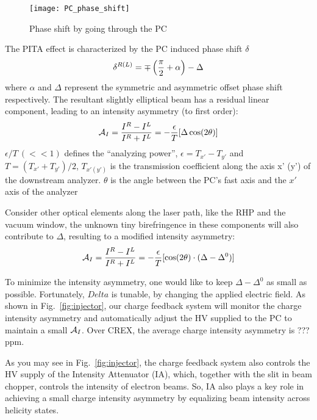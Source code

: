 \begin{figure}[h!]
    \centering
    \texttt{[image: PC\_phase\_shift]}
    \caption{Phase shift by going through the PC}
    \label{fig:pc_phase_shift}
\end{figure}

The PITA effect is characterized by the PC induced phase shift $\delta$
\begin{equation*}
    \delta^{R(L)} = \mp\left(\frac{\pi}{2} + \alpha \right) - \Delta \\
\end{equation*}
where $\alpha$ and $\Delta$ represent the symmetric and asymmetric offset phase
shift respectively. The resultant slightly elliptical beam has a residual
linear component, leading to an intensity asymmetry (to first order):
\begin{equation}
    \mathcal{A}_{I} = \frac{I^R - I^L}{I^R + I^L} = -\frac{\epsilon}{T}[\Delta\cos(2\theta)]	\\
\end{equation}
$\epsilon/T \ (<<1)$ defines the ``analyzing power'', $\epsilon = T_{x'} - T_{y'}$ 
and $T = (T_{x'} + T_{y'})/2$,
$T_{x' (y')}$ is the transmission coefficient along the axis x' (y') of the
downstream analyzer. $\theta$ is the angle between the PC's fast axis and the 
$x'$ axis of the analyzer

Consider other optical elements along the laser path, like the RHP and the vacuum
window, the unknown tiny birefringence in these components will also contribute to $\Delta$,
resulting to a modified intensity asymmetry:
\begin{equation}
    \mathcal{A}_{I} = \frac{I^R - I^L}{I^R + I^L} = -\frac{\epsilon}{T}[\cos(2\theta)\cdot(\Delta - \Delta^0)]	\\
\end{equation}

To minimize the intensity asymmetry, one would like to keep $\Delta - \Delta^0$
as small as possible. Fortunately, $Delta$ is tunable, by changing the applied
electric field. As shown in Fig.~\ref{fig:injector}, our charge feedback system
will monitor the charge intensity asymmetry and automatically adjust the HV 
supplied to the PC to maintain a small $\mathcal{A}_I$. Over CREX, the average charge
intensity asymmetry is ??? ppm.

As you may see in Fig.~\ref{fig:injector}, the charge feedback system also
controls the HV supply of the Intensity Attenuator (IA), which, together with
the slit in beam chopper, controls the intensity of electron beams. So, IA also
plays a key role in achieving a small charge intensity asymmetry by equalizing
beam intensity across helicity states.

